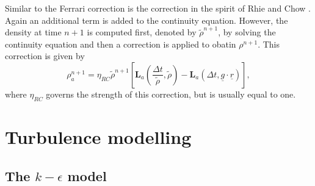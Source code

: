 \documentclass[12pt]{memoir}
\newcommand{\uvec}[1]{\underline{#1}}
\newcommand{\Lap}{\textbf{L}}
\begin{document}
Similar to the Ferrari correction is the correction in the spirit of
Rhie and Chow . Again an additional term is added to the
continuity equation. However, the density at time $n+1$ is computed
first, denoted by $\widetilde{\rho}^{n+1}$, by solving the continuity
equation and then a correction is applied to obatin $\rho^{n+1}$. This
correction is given by
\begin{equation}
\rho_a^{n+1} = \eta_{RC} \widetilde{\rho}^{n+1} \left[ \Lap_a\left(
\frac{\Delta t}{\widetilde{\rho}}, \widetilde{\rho}
\right) - \Lap_a (\Delta t, \uvec{g}\cdot\uvec{r})\right],
\label{e:rc}
\end{equation}
where $\eta_{RC}$ governs the strength of this correction, but is
usually equal to one.


\section{Turbulence modelling}

\subsection{The $k-\epsilon$ model}
\end{document}

